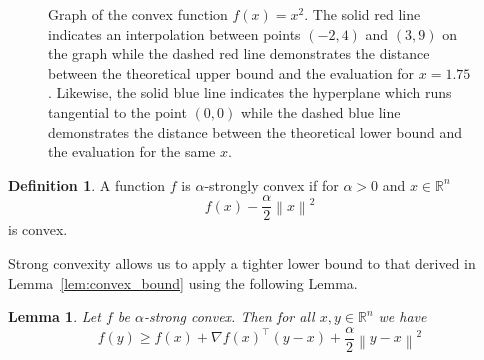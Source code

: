 \documentclass{article}
\newcommand{\R}{\mathbb R}
\newcommand{\norm}[1]{\left\| #1 \right\| }
\newtheorem{lemma}{Lemma}
\theoremstyle{definition}
\newtheorem{definition}{Definition}
\begin{document}
\begin{figure}[t]
    \begin{center}
    \end{center}
    \caption{Graph of the convex function $f(x) = x^2$. The solid red line
    indicates an interpolation between points $(-2, 4)$ and $(3, 9)$ on the
    graph while the dashed red line demonstrates the distance between the
    theoretical upper bound and the evaluation for $x = 1.75$. Likewise, the
    solid blue line indicates the hyperplane which runs tangential to the point
    $(0, 0)$ while the dashed blue line demonstrates the distance between the
    theoretical lower bound and the evaluation for the same $x$.}%
    \label{fig:convex}
\end{figure}

\begin{definition}
    A function $f$ is $\alpha$-strongly convex if for $\alpha > 0$ and $x \in
    \R^n$
    \begin{equation}
        f(x) - \frac{\alpha}{2}\norm{x}^2   
    \end{equation}
    is convex.
\end{definition}

Strong convexity allows us to apply a tighter lower bound to that derived in
Lemma~\ref{lem:convex_bound} using the following Lemma.

\begin{lemma}
    Let $f$ be $\alpha$-strong convex. Then for all $x, y \in \R^n$ we have 
    \begin{equation}
        f(y) \geq f(x) + \nabla {f(x)}^\intercal(y - x) + \frac{\alpha}{2}
        \norm{y - x}^2
    \end{equation}
\end{lemma}
\end{document}
